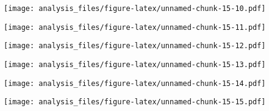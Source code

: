 \documentclass[
]{article}
\newenvironment{Shaded}{\begin{snugshade}}{\end{snugshade}}
\newcommand{\KeywordTok}[1]{\textcolor[rgb]{0.13,0.29,0.53}{\textbf{#1}}}
\newcommand{\NormalTok}[1]{#1}
\newcommand{\OperatorTok}[1]{\textcolor[rgb]{0.81,0.36,0.00}{\textbf{#1}}}
\begin{document}
\texttt{[image: analysis\_files/figure-latex/unnamed-chunk-15-10.pdf]}

\begin{Shaded}
\end{Shaded}

\texttt{[image: analysis\_files/figure-latex/unnamed-chunk-15-11.pdf]}

\begin{Shaded}
\end{Shaded}

\texttt{[image: analysis\_files/figure-latex/unnamed-chunk-15-12.pdf]}

\begin{Shaded}
\end{Shaded}

\texttt{[image: analysis\_files/figure-latex/unnamed-chunk-15-13.pdf]}

\begin{Shaded}
\end{Shaded}

\texttt{[image: analysis\_files/figure-latex/unnamed-chunk-15-14.pdf]}

\begin{Shaded}
\end{Shaded}

\texttt{[image: analysis\_files/figure-latex/unnamed-chunk-15-15.pdf]}

\begin{Shaded}
\end{Shaded}
\end{document}
